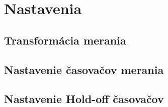 \documentclass[main.tex]{subfiles}
\begin{document}
	\section{Nastavenia}
		\begin{multicols*}{2}
			
			\subsection{Transformácia merania}
			
			
			\subsection{Nastavenie časovačov merania}
			
			
			\subsection{Nastavenie Hold-off časovačov}
		\end{multicols*}
\end{document}
